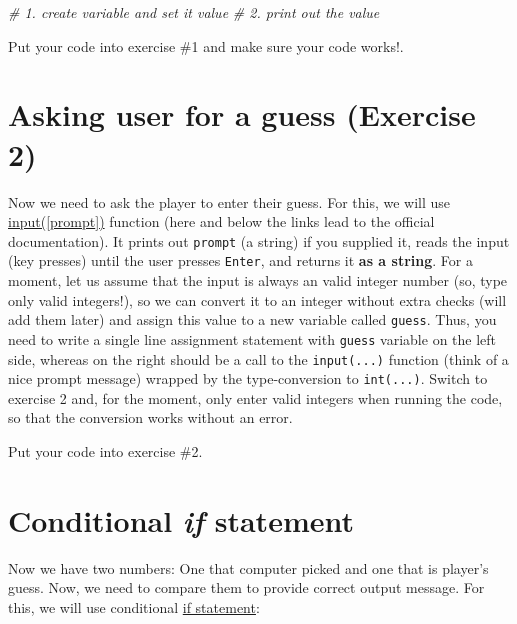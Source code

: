 \documentclass[
]{book}
\newenvironment{Shaded}{\begin{snugshade}}{\end{snugshade}}
\newcommand{\CommentTok}[1]{\textcolor[rgb]{0.56,0.35,0.01}{\textit{#1}}}
\begin{document}
\begin{Shaded}
\begin{Highlighting}[]
\CommentTok{\# 1. create variable and set it value}
\CommentTok{\# 2. print out the value}
\end{Highlighting}
\end{Shaded}

Put your code into exercise \#1 and make sure your code works!.

\hypertarget{input-function}{%
\section{Asking user for a guess (Exercise 2)}\label{input-function}}

Now we need to ask the player to enter their guess. For this, we will use \href{https://docs.python.org/3/library/functions.html\#input}{input({[}prompt{]})} function (here and below the links lead to the official documentation). It prints out \texttt{prompt} (a string) if you supplied it, reads the input (key presses) until the user presses \texttt{Enter}, and returns it \textbf{as a string}. For a moment, let us assume that the input is always an valid integer number (so, type only valid integers!), so we can convert it to an integer without extra checks (will add them later) and assign this value to a new variable called \texttt{guess}. Thus, you need to write a single line assignment statement with \texttt{guess} variable on the left side, whereas on the right should be a call to the \texttt{input(...)} function (think of a nice prompt message) wrapped by the type-conversion to \texttt{int(...)}. Switch to exercise 2 and, for the moment, only enter valid integers when running the code, so that the conversion works without an error.

Put your code into exercise \#2.

\hypertarget{conditional-if-statement}{%
\section{\texorpdfstring{Conditional \emph{if} statement}{Conditional if statement}}\label{conditional-if-statement}}

Now we have two numbers: One that computer picked and one that is player's guess. Now, we need to compare them to provide correct output message. For this, we will use conditional \href{https://docs.python.org/3/tutorial/controlflow.html\#if-statements}{if statement}:
\end{document}
